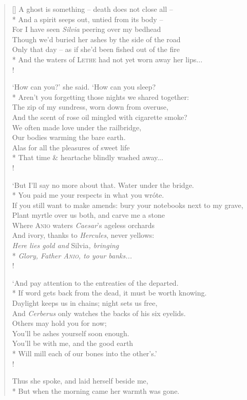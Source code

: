 \settowidth{\versewidth}{Only that day -- as if she'd been fished out of the fire}
\begin{verse}[\versewidth]
A ghost is something -- death does not close all --\\*
\vin And a spirit seeps out, untied from its body --\\
For I have seen \textit{Silvia} peering over my bedhead\\
\vin Though we'd buried her ashes by the side of the road\\
Only that day -- as if she'd been fished out of the fire\\*
\vin And the waters of \textsc{Lethe} had not yet worn away her lips...\\!

`How can you?' she said. `How can you sleep?\\*
\vin Aren't you forgetting those nights we shared together:\nobreak\\
The zip of my sundress, worn down from overuse,\\
\vin And the scent of rose oil mingled with cigarette smoke?\\
We often made love under the railbridge,\\
\vin Our bodies warming the bare earth.\\
Alas for all the pleasures of sweet life\\*
\vin That time \& heartache blindly washed away...\\!

`But I'll say no more about that. Water under the bridge.\nobreak\\*
\vin You paid me your respects in what you wr\'ote.\\
If you still want to make amends: bury your notebooks next to my grave,\\
\vin Plant myrtle over us both, and carve me a stone\\
Where \textsc{Anio} waters \textit{Caesar}'s ageless orchards\\
\vin And ivory, thanks to \textit{Hercules}, never yellows:\\
\textit{Here lies gold and }Silvia\textit{, bringing}\\*
\vin \textit{Glory, Father \textsc{Anio}, to your banks...}\\!

`And pay attention to the entreaties of the departed.\\*
\vin If word gets back from the dead, it must be worth knowing.\\
Daylight keeps us in chains; night sets us free,\\
\vin And \textit{Cerberus} only watches the backs of his six eyelids.\nobreak\\
Others may hold you for now;\\
\vin You'll be ashes yourself soon enough.\\
You'll be with me, and the good earth\\*
\vin Will mill each of our bones into the other's.'\\!

Thus she spoke, and laid herself beside me,\\*
\vin But when the morning came her warmth was gone.
\end{verse}
